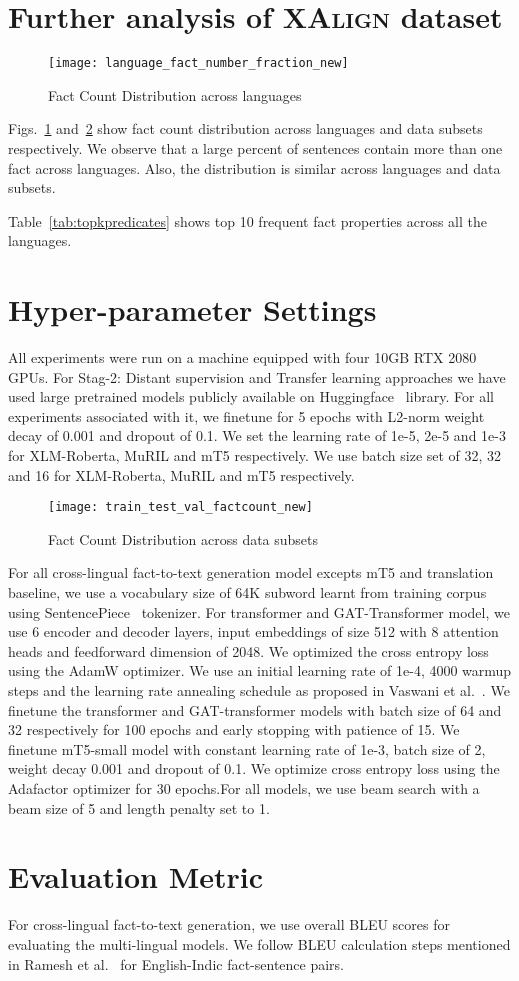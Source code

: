 \documentclass[11pt]{article}
\begin{document}
\section{Further analysis of \textsc{XAlign} dataset}
\begin{figure}
    \centering
    \texttt{[image: language\_fact\_number\_fraction\_new]}
    \caption{Fact Count Distribution across languages}
    \label{fig:language_fact_number_fraction}
\end{figure}

Figs.~\ref{fig:language_fact_number_fraction} and~\ref{fig:train_test_val_factcount} show fact count distribution across languages and data subsets respectively. We observe that a large percent of sentences contain more than one fact across languages. Also, the distribution is similar across languages and data subsets.

Table~\ref{tab:topkpredicates} shows top 10 frequent fact properties across all the languages.

\section{Hyper-parameter Settings}
All experiments were run on a machine equipped with four
10GB RTX 2080 GPUs. For Stag-2: Distant supervision and Transfer learning approaches we have used large pretrained models publicly available on Huggingface~\cite{wolf2020transformers} library. For all experiments associated with it, we finetune for 5 epochs with L2-norm weight decay of 0.001 and dropout of 0.1. We set the learning rate of 1e-5, 2e-5 and 1e-3 for XLM-Roberta, MuRIL and mT5 respectively. We use batch size set of 32, 32 and 16 for XLM-Roberta, MuRIL and mT5 respectively. 

\begin{figure}
    \centering
    \texttt{[image: train\_test\_val\_factcount\_new]}
    \caption{Fact Count Distribution across data subsets}
    \label{fig:train_test_val_factcount}
\end{figure}

For all cross-lingual fact-to-text generation model excepts mT5 and translation baseline, we use a vocabulary
size of 64K subword learnt from training corpus using
SentencePiece~\cite{kudo2018sentencepiece} tokenizer. For transformer and GAT-Transformer model, we use 6 encoder and decoder layers, input embeddings of size 512 with 8 attention heads and
feedforward dimension of 2048. We optimized the
cross entropy loss using the AdamW optimizer. We use an initial learning rate of 1e-4, 4000 warmup steps and the learning rate annealing schedule as proposed in Vaswani et al.~\cite{vaswani2017attention}. We finetune the transformer and GAT-transformer models with batch size of 64 and 32 respectively for 100 epochs and early stopping with patience of 15. We finetune mT5-small model with constant learning rate of 1e-3, batch size of 2, weight decay 0.001 and dropout of 0.1. We optimize cross entropy loss using the Adafactor optimizer for 30 epochs.For all models, we use beam search with a beam size of 5 and length penalty set to 1. 

\section{Evaluation Metric}
For cross-lingual fact-to-text generation, we use overall BLEU scores for evaluating the multi-lingual models. We follow BLEU calculation steps mentioned in Ramesh et al.~\cite{ramesh2021samanantar} for English-Indic fact-sentence pairs. 
\end{document}

